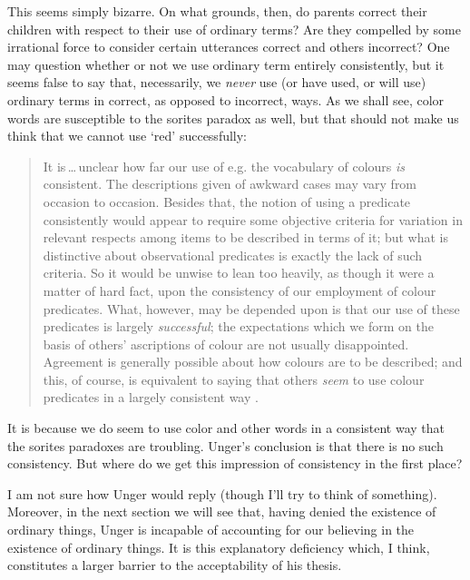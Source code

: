 \documentclass[11pt]{standalone} \newif\ifstandlone \standalonetrue
\newenvironment{squote}{%
	\begin{quote}\begin{singlespace}%
	}{%
	\end{singlespace}\end{quote}}
\begin{document}
\begin{spacing}{1.5}
This seems simply bizarre.  On what grounds, then, do parents correct
their children with respect to their use of ordinary terms?  Are they
compelled by some irrational force to consider certain utterances
correct and others incorrect?  One may question whether or not we use
ordinary term entirely consistently, but it seems false to say that,
necessarily, we {\em never} use (or have used, or will use) ordinary
terms in correct, as opposed to incorrect, ways.  As we shall see,
color words are susceptible to the sorites paradox as well, but that
should not make us think that we cannot use `red' successfully:

\begin{squote}
It is\,\ldots\,unclear how far our use of e.g. the vocabulary of
colours \emph{is} consistent.  The descriptions given of awkward cases
may vary from occasion to occasion.  Besides that, the notion of using
a predicate consistently would appear to require some objective
criteria for variation in relevant respects among items to be
described in terms of it; but what is distinctive about observational
predicates is exactly the lack of such criteria.  So it would be
unwise to lean too heavily, as though it were a matter of hard fact,
upon the consistency of our employment of colour predicates.  What,
however, may be depended upon is that our use of these predicates is
largely \emph{successful}; the expectations which we form on the basis
of others' ascriptions of colour are not usually disappointed.
Agreement is generally possible about how colours are to be described;
and this, of course, is equivalent to saying that others \emph{seem}
to use colour predicates in a largely consistent way
\citep[361]{wright1975}.
\end{squote}

It is because we do seem to use color and other words in a consistent
way that the sorites paradoxes are troubling.  Unger's conclusion is
that there is no such consistency.  But where do we get this
impression of consistency in the first place?

I am not sure how Unger would reply (though I'll try to think of
something).  Moreover, in the next section we will see that, having
denied the existence of ordinary things, Unger is incapable of
accounting for our believing in the existence of ordinary things.  It
is this explanatory deficiency which, I think, constitutes a larger
barrier to the acceptability of his thesis.


\end{spacing}
\end{document}
